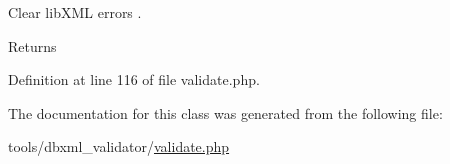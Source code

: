 Clear lib\+X\+M\+L errors . 

\begin{DoxyReturn}{Returns}

\end{DoxyReturn}


Definition at line 116 of file validate.\+php.



The documentation for this class was generated from the following file\+:\begin{DoxyCompactItemize}
\item 
tools/dbxml\+\_\+validator/\hyperlink{validate_8php}{validate.\+php}\end{DoxyCompactItemize}
